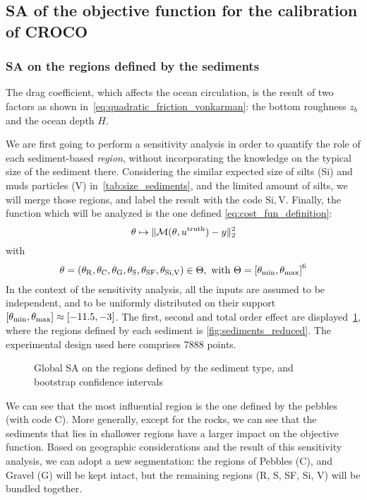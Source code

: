 \documentclass[../../Main_ManuscritThese.tex]{subfiles}
\newcommand{\zob}{z_b}
\newcommand\imgpath{/home/victor/acadwriting/Manuscrit/Text/Chapter5/img/}
\begin{document}
\subsection{SA of the objective function for the calibration of CROCO}
\subsubsection{SA on the regions defined by the sediments}
The drag coefficient, which affects the ocean circulation, is the
result of two factors as shown
in~\cref{eq:quadratic_friction_vonkarman}: the bottom roughness
$\zob$ and the ocean depth $H$.

We are first going to perform a sensitivity analysis in order to
quantify the role of each sediment-based \emph{region}, without
incorporating the knowledge on the typical size of the sediment there.
Considering the similar expected size of silts (Si) and muds particles
(V) in~\cref{tab:size_sediments}, and the limited amount of silts, we
will merge those regions, and label the result with the code
$\mathrm{Si,V}$. Finally, the function which will be analyzed is the one
defined \cref{eq:cost_fun_definition}:
\begin{equation}
\theta \mapsto \|\mathcal{M}(\theta, u^{\mathrm{truth}}) - y \|_2^2
\end{equation}
with
\begin{equation}
  \kk = (\kk_{\mathrm{R}},\kk_{\mathrm{C}},\kk_{\mathrm{G}},\kk_{\mathrm{S}},
  \kk_{\mathrm{SF}},\kk_{\mathrm{Si,V}})\in\Kspace, \text{ with }
  \Kspace = \interval{\kk_{\min}}{\kk_{\max}}^6
\end{equation}
In the context of the sensitivity analysis, all the inputs are assumed
to be independent, and to be uniformly distributed on their support $\interval{\kk_{\min}}{\kk_{\max}}\approx \interval{\num{-11.5}}{\num{-3}}$.
The first, second and total order effect are
displayed~\cref{fig:SA_sediments}, where the regions defined by each
sediment is \cref{fig:sediments_reduced}. The experimental design used
here comprises \num{7888} points.

\label{ssec:SA_sediments}
\begin{figure}[ht]
  \centering
  
  \caption[SA on the sediments-based regions]{\label{fig:SA_sediments} Global SA on the regions defined by the sediment type, and bootstrap confidence intervals}
\end{figure}

We can see that the most influential region is the one defined by the
pebbles (with code C). More generally, except for the rocks, we can
see that the sediments that lies in shallower regions have a larger
impact on the objective function.  Based on geographic considerations
and the result of this sensitivity analysis, we can adopt a new
segmentation: the regions of Pebbles (C), and Gravel (G) will be kept
intact, but the remaining regions (R, S, SF, Si, V) will be bundled
together.
\end{document}

